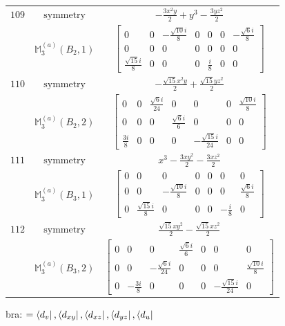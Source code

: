 \documentclass[fleqn,8pt,landscape]{jsarticle}
\begin{document}
\begin{longtable}{ccc}
$ 109 $ & $ \text{symmetry} $ & $ - \frac{3 x^{2} y}{2} + y^{3} - \frac{3 y z^{2}}{2} $ \\
$  $ & $ \mathbb{M}_{3}^{(a)}(B_{2},1) $ & $ \begin{bmatrix} 0 & 0 & - \frac{\sqrt{10} i}{8} & 0 & 0 & 0 & - \frac{\sqrt{6} i}{8} \\ 0 & 0 & 0 & 0 & 0 & 0 & 0 \\ \frac{\sqrt{15} i}{8} & 0 & 0 & 0 & \frac{i}{8} & 0 & 0 \end{bmatrix} $ \\ \hline
$ 110 $ & $ \text{symmetry} $ & $ - \frac{\sqrt{15} x^{2} y}{2} + \frac{\sqrt{15} y z^{2}}{2} $ \\
$  $ & $ \mathbb{M}_{3}^{(a)}(B_{2},2) $ & $ \begin{bmatrix} 0 & 0 & \frac{\sqrt{6} i}{24} & 0 & 0 & 0 & \frac{\sqrt{10} i}{8} \\ 0 & 0 & 0 & \frac{\sqrt{6} i}{6} & 0 & 0 & 0 \\ \frac{3 i}{8} & 0 & 0 & 0 & - \frac{\sqrt{15} i}{24} & 0 & 0 \end{bmatrix} $ \\ \hline
$ 111 $ & $ \text{symmetry} $ & $ x^{3} - \frac{3 x y^{2}}{2} - \frac{3 x z^{2}}{2} $ \\
$  $ & $ \mathbb{M}_{3}^{(a)}(B_{3},1) $ & $ \begin{bmatrix} 0 & 0 & 0 & 0 & 0 & 0 & 0 \\ 0 & 0 & - \frac{\sqrt{10} i}{8} & 0 & 0 & 0 & \frac{\sqrt{6} i}{8} \\ 0 & \frac{\sqrt{15} i}{8} & 0 & 0 & 0 & - \frac{i}{8} & 0 \end{bmatrix} $ \\ \hline
$ 112 $ & $ \text{symmetry} $ & $ \frac{\sqrt{15} x y^{2}}{2} - \frac{\sqrt{15} x z^{2}}{2} $ \\
$  $ & $ \mathbb{M}_{3}^{(a)}(B_{3},2) $ & $ \begin{bmatrix} 0 & 0 & 0 & \frac{\sqrt{6} i}{6} & 0 & 0 & 0 \\ 0 & 0 & - \frac{\sqrt{6} i}{24} & 0 & 0 & 0 & \frac{\sqrt{10} i}{8} \\ 0 & - \frac{3 i}{8} & 0 & 0 & 0 & - \frac{\sqrt{15} i}{24} & 0 \end{bmatrix} $ \\ \hline
\end{longtable}
bra: $=\bra{d_{v}}, \bra{d_{xy}}, \bra{d_{xz}}, \bra{d_{yz}}, \bra{d_{u}}$
\end{document}
